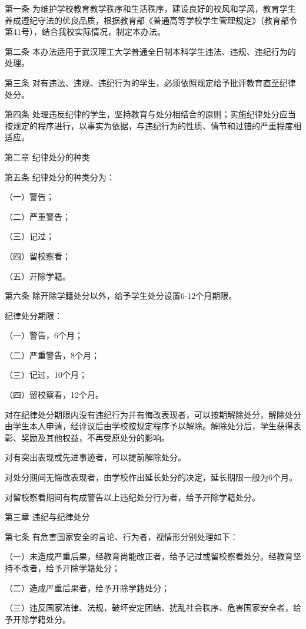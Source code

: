 \documentclass[UTF8,12pt,a4paper]{report}
\begin{document}
第一条  为维护学校教育教学秩序和生活秩序，建设良好的校风和学风，教育学生养成遵纪守法的优良品质，根据教育部《普通高等学校学生管理规定》（教育部令第41号），结合我校实际情况，制定本办法。

第二条  本办法适用于武汉理工大学普通全日制本科学生违法、违规、违纪行为的处理。

第三条  对有违法、违规、违纪行为的学生，必须依照规定给予批评教育直至纪律处分。

第四条  处理违反纪律的学生，坚持教育与处分相结合的原则；实施纪律处分应当按规定的程序进行，以事实为依据，与违纪行为的性质、情节和过错的严重程度相适应。



第二章  纪律处分的种类

第五条  纪律处分的种类分为：

（一）警告；

（二）严重警告；

（三）记过；

（四）留校察看；

（五）开除学籍。

第六条  除开除学籍处分以外，给予学生处分设置6-12个月期限。

纪律处分期限：

（一）警告，6个月；

（二）严重警告，8个月；

（三）记过，10个月；

（四）留校察看，12个月。

对在纪律处分期限内没有违纪行为并有悔改表现者，可以按期解除处分，解除处分由学生本人申请，经评议后由学校按规定程序予以解除。解除处分后，学生获得表彰、奖励及其他权益，不再受原处分的影响。

对有突出表现或先进事迹者，可以提前解除处分。

对处分期间无悔改表现者，由学校作出延长处分的决定，延长期限一般为6个月。

对留校察看期间有构成警告以上违纪处分行为者，给予开除学籍处分。



第三章  违纪与纪律处分

第七条  有危害国家安全的言论、行为者，视情形分别处理如下：

（一）未造成严重后果，经教育尚能改正者，给予记过或留校察看处分。经教育坚持不改者，给予开除学籍处分；

（二）造成严重后果者，给予开除学籍处分；

（三）违反国家法律、法规，破坏安定团结、扰乱社会秩序、危害国家安全者，给予开除学籍处分。
\end{document}
